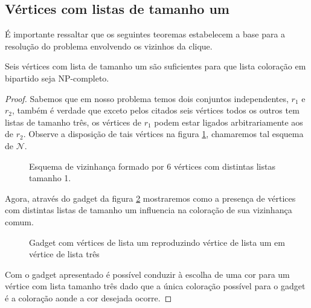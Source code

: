 \subsection{Vértices com listas de tamanho um}
É importante ressaltar que os seguintes teoremas estabelecem a base para a resolução do problema envolvendo os vizinhos da clique. 
\begin{teorema}
 \label{teorema:6-v-np}
  Seis vértices com lista de tamanho um são suficientes para que lista coloração em bipartido seja NP-completo. 
\end{teorema}
\begin{proof}
 Sabemos que em nosso problema temos dois conjuntos independentes, $r_1$ e $r_2$, também é verdade que exceto pelos citados seis vértices todos os outros tem listas de tamanho três, os vértices de $r_1$ podem estar ligados arbitrariamente aos de $r_2$. Observe a disposição de tais vértices na figura \ref{fig:seis-vertices-lista-um}, chamaremos tal esquema de $\mathcal{N}$.
 
\begin{figure}[H]
		\centering
		\fontsize{8}{10}
		
		\caption{Esquema de vizinhança formado por 6 vértices com distintas listas tamanho 1. }
		\label{fig:seis-vertices-lista-um}
\end{figure}

Agora, através do gadget da figura \ref{fig:gadget} mostraremos como a presença de vértices com distintas listas de tamanho um influencia na coloração de sua vizinhança comum.

\begin{figure}[H]
  \begin{subfigure}
    \centering
		
  \end{subfigure}
  \begin{subfigure}
    \centering
		
  \end{subfigure}
  \begin{subfigure}
    \centering
		
  \end{subfigure}
  \caption{Gadget com vértices de lista um reproduzindo vértice de lista um em vértice de lista três}
  \label{fig:gadget}
\end{figure}

Com o gadget apresentado é possível conduzir à escolha de uma cor para um vértice com lista tamanho três dado que a única coloração possível para o gadget é a coloração aonde a cor desejada ocorre.


\end{proof}
